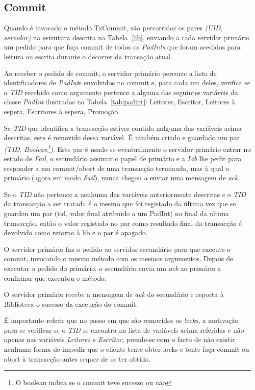 \subsection{Commit}

Quando é invocado o método TxCommit, são percorridos os pares \textit{(UID, servidor)} na estrutura descrita na Tabela~\ref{lib}, enviando a cada servidor primário um pedido para que faça commit de todos os \textit{PadInts} que foram acedidos para leitura ou escrita durante o decorrer da transação atual.

Ao receber o pedido de commit, o servidor primário percorre a lista de identificadores de \textit{PadInt}s envolvidos no commit e, para cada um deles, verifica se o \textit{TID} recebido como argumento pertence a alguma das seguintes variáveis da classe \textit{PadInt} ilustradas na Tabela~\ref{tab:padint}: Leitores, Escritor, Leitores à espera, Escritores à espera, Promoção.

Se \textit{TID} que identifica a transacção estiver contido nalguma das variáveis acima descritas, este é removido dessa variável. É também criado e guardado um par \textit{(TID, Boolean\footnote{O boolean indica se o commit teve sucesso ou não})}. Este par é usado se eventualmente o servidor primário entrar no estado de \textit{Fail}, o secundário assumir o papel de primário e a \textit{Lib} lhe pedir para responder a um commit/abort de uma transacção terminada, mas à qual o primário (agora em modo \textit{Fail}), nunca chegou a enviar uma mensagem de \textit{ack}.

Se o \textit{TID} não pertence a nenhuma das variáveis anteriormente descritas e o \textit{TID} da transacção a ser tratada é o mesmo que foi registado da última vez que se guardou um par (tid, valor final atribuido a um PadInt) no final da ultima transacção, então o valor registado no par como resultado final da transacção é devolvido como retorno à lib e o par é apagado.

O servidor primário faz o pedido ao servidor secundário para que execute o commit, invocando o mesmo método com os mesmos argumentos. Depois de executar o pedido do primário, o secundário envia um \textit{ack} ao primário a confirmar que executou o método.

O servidor primário recebe a mensagem de \textit{ack} do secundário e reporta à Biblioteca o sucesso da execução do commit.

É importante referir que no passo em que são removidos os \textit{locks}, a motivação para se verificar se o \textit{TID} se encontra na lista de variáveis acima referidas e não apenas nas variáveis \textit{Leitores} e \textit{Escritor}, prende-se com o facto de não existir nenhuma forma de impedir que o cliente tente obter locks e tente faça commit ou abort à transacção antes sequer de os ter obtido.